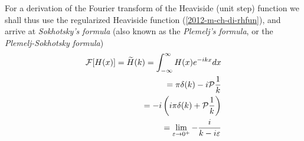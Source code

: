\fi
For a derivation of  the Fourier transform of the Heaviside (unit step) function
we shall thus use the  regularized Heaviside function (\ref{2012-m-ch-di-rhfun}), and arrive at
{\em Sokhotsky's  formula} (also known as the {\em Plemelj's  formula}, or the {\em Plemelj-Sokhotsky formula})
\begin{equation}
\begin{split}
 {\cal F}[H(x)]=\widetilde{H}(k)=   \int_{-\infty}^\infty  H(x) e^{-i{kx}} dx   \\
\qquad =    \pi \delta(k) -  i {\cal P}  \frac{1}{k} \\
\qquad =   -i \left(i\pi \delta(k) + {\cal P} \frac{1}{k}\right)\\
\qquad =   \lim_{\varepsilon \rightarrow 0^+} -\frac{i}{k-i\varepsilon }
\end{split}
\end{equation}

